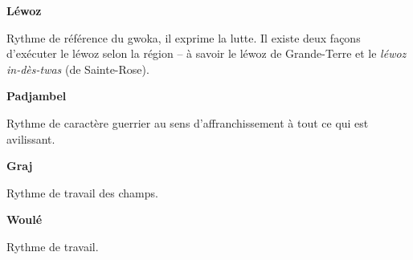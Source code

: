 

{\large \textbf{Léwoz}}

Rythme de référence du gwoka, il exprime la lutte.
Il existe deux façons d'exécuter le léwoz selon la région -- à savoir le léwoz de Grande-Terre et le \textit{léwoz in-dès-twas} (de Sainte-Rose).
\bigskip
\begin{quote}
{%
\parindent 0pt
\noindent
\ifx\preLilyPondExample \undefined
\else
  \expandafter\preLilyPondExample
\fi
\def\lilypondbook{}%

\ifx\postLilyPondExample \undefined
\else
  \expandafter\postLilyPondExample
\fi
}
\end{quote}



\bigskip
\bigskip
{\large \textbf{Padjambel}}

Rythme de caractère guerrier au sens d'affranchissement à tout ce qui est avilissant.
\bigskip
\begin{quote}
{%
\parindent 0pt
\noindent
\ifx\preLilyPondExample \undefined
\else
  \expandafter\preLilyPondExample
\fi
\def\lilypondbook{}%

\ifx\postLilyPondExample \undefined
\else
  \expandafter\postLilyPondExample
\fi
}
\end{quote}

\clearpage
\bigskip
\bigskip
{\large \textbf{Graj}}

Rythme de travail des champs.
\bigskip
\begin{quote}
{%
\parindent 0pt
\noindent
\ifx\preLilyPondExample \undefined
\else
  \expandafter\preLilyPondExample
\fi
\def\lilypondbook{}%

\ifx\postLilyPondExample \undefined
\else
  \expandafter\postLilyPondExample
\fi
}
\end{quote}



\bigskip
\bigskip
{\large \textbf{Woulé}}

Rythme de travail.
\bigskip
\begin{quote}
{%
\parindent 0pt
\noindent
\ifx\preLilyPondExample \undefined
\else
  \expandafter\preLilyPondExample
\fi
\def\lilypondbook{}%

\ifx\postLilyPondExample \undefined
\else
  \expandafter\postLilyPondExample
\fi
}
\end{quote}


